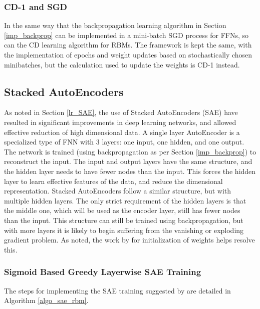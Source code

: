 \documentclass[a4paper,11pt,oneside]{article}
\theoremstyle{plain}
\theoremstyle{definition}
\begin{document}
	\subsubsection{CD-1 and SGD}
	
	In the same way that the backpropagation learning algorithm in Section \ref{imp_backprop} can be implemented in a mini-batch SGD process for FFNs, so can the CD learning algorithm for RBMs. The framework is kept the same, with the implementation of epochs and weight updates based on stochastically chosen minibatches, but the calculation used to update the weights is CD-1 instead.
	
	
	\subsection{Stacked AutoEncoders}\label{imp_SAE}
	
	As noted in Section \ref{lr_SAE}, the use of Stacked AutoEncoders (SAE) have resulted in significant improvements in deep learning networks, and allowed effective reduction of high dimensional data. A single layer AutoEncoder is a specialized type of FNN with 3 layers: one input, one hidden, and one output. The network is trained (using backpropagation as per Section \ref{imp_backprop}) to reconstruct the input. The input and output layers have the same structure, and the hidden layer needs to have fewer nodes than the input. This forces the hidden layer to learn effective features of the data, and reduce the dimensional representation. 
	\newline\newline
	Stacked AutoEncoders follow a similar structure, but with multiple hidden layers. The only strict requirement of the hidden layers is that the middle one, which will be used as the encoder layer, still has fewer nodes than the input. This structure can still be trained using backpropagation, but with more layers it is likely to begin suffering from the vanishing or exploding gradient problem. As noted, the work by \citet{Hinton2} for initialization of weights helps resolve this.
	
	\subsubsection{Sigmoid Based Greedy Layerwise SAE Training}\label{imp_sigmoidsae}
	
	The steps for implementing the SAE training suggested by \citet{Hinton2} are detailed in Algorithm \ref{algo_sae_rbm}.\newline
	
\end{document}
